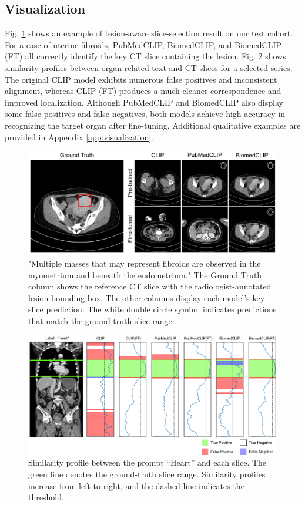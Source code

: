 \documentclass[bioengineering,article,submit,pdftex,moreauthors]{Definitions/mdpi}
\begin{document}
\subsection{Visualization}\label{sec:visualization}
Fig. \ref{fig:lesion_aware_results} shows an example of lesion-aware slice-selection result on our test cohort. 
For a case of uterine fibroids, PubMedCLIP, BiomedCLIP, and BiomedCLIP (FT) all correctly identify the key CT slice containing the lesion.
Fig. \ref{fig:organ_aware_results} shows similarity profiles between organ-related text and CT slices for a selected series. 
The original CLIP model exhibits numerous false positives and inconsistent alignment, whereas CLIP (FT) produces a much cleaner correspondence and improved localization. 
Although PubMedCLIP and BiomedCLIP also display some false positives and false negatives, both models achieve high accuracy in recognizing the target organ after fine-tuning. 
Additional qualitative examples are provided in Appendix \ref{app:visualization}.


\begin{figure}[ht]
  \centering
  \includegraphics[width=1\textwidth]{./figures/figure2_4.png}
  \caption{"Multiple masses that may represent fibroids are observed in the myometrium and beneath the endometrium."
  The Ground Truth column shows the reference CT slice with the radiologist-annotated lesion bounding box.
  The other columns display each model’s key-slice prediction.
  The white double circle symbol indicates predictions that match the ground-truth slice range.
  }
  \label{fig:lesion_aware_results}
\end{figure}


\begin{figure}[ht]
  \centering
  \includegraphics[width=1\textwidth]{./figures/figure3_4.png}
  \caption{Similarity profile between the prompt “Heart” and each slice. 
  The green line denotes the ground-truth slice range. 
  Similarity profiles increase from left to right, and the dashed line indicates the threshold. 
  }
  \label{fig:organ_aware_results}
\end{figure}
\end{document}
